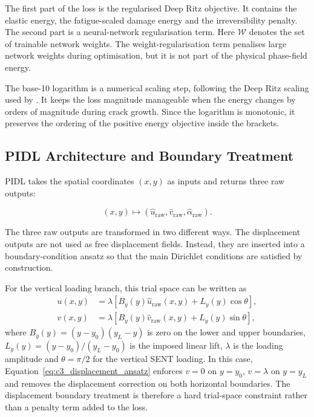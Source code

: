 The first part of the loss is the regularised Deep Ritz objective. It contains the elastic energy, the fatigue-scaled damage energy and the irreversibility penalty. The second part is a neural-network regularisation term. Here \(\mathcal{W}\) denotes the set of trainable network weights. The weight-regularisation term penalises large network weights during optimisation, but it is not part of the physical phase-field energy.


The base-10 logarithm is a numerical scaling step, following the Deep Ritz scaling used by \citet{Manav2024cmame}. It keeps the loss magnitude manageable when the energy changes by orders of magnitude during crack growth. Since the logarithm is monotonic, it preserves the ordering of the positive energy objective inside the brackets.

\subsection{PIDL Architecture and Boundary Treatment}
\label{subsec:c3_neural_field}

PIDL takes the spatial coordinates $(x,y)$ as inputs and returns three raw outputs:

\begin{equation}
    (x,y) \mapsto \left(\hat{u}_{\mathrm{raw}},\hat{v}_{\mathrm{raw}},\hat{\alpha}_{\mathrm{raw}}\right).
    \label{eq:c3_network_mapping}
\end{equation}

The three raw outputs are transformed in two different ways. The displacement outputs are not used as free displacement fields. Instead, they are inserted into a boundary-condition ansatz so that the main Dirichlet conditions are satisfied by construction.

For the vertical loading branch, this trial space can be written as
\begin{equation}
    \begin{aligned}
    u(x,y)
    &=
    \lambda
    \left[
    B_y(y)\hat{u}_{\mathrm{raw}}(x,y)
    +
    L_y(y)\cos\theta
    \right],
    \\
    v(x,y)
    &=
    \lambda
    \left[
    B_y(y)\hat{v}_{\mathrm{raw}}(x,y)
    +
    L_y(y)\sin\theta
    \right],
    \end{aligned}
    \label{eq:c3_displacement_ansatz}
\end{equation}
where $B_y(y)=(y-y_0)(y_L-y)$ is zero on the lower and upper boundaries, $L_y(y)=(y-y_0)/(y_L-y_0)$ is the imposed linear lift, $\lambda$ is the loading amplitude and $\theta=\pi/2$ for the vertical SENT loading. In this case, Equation~\ref{eq:c3_displacement_ansatz} enforces $v=0$ on $y=y_0$, $v=\lambda$ on $y=y_L$ and removes the displacement correction on both horizontal boundaries. The displacement boundary treatment is therefore a hard trial-space constraint rather than a penalty term added to the loss.

